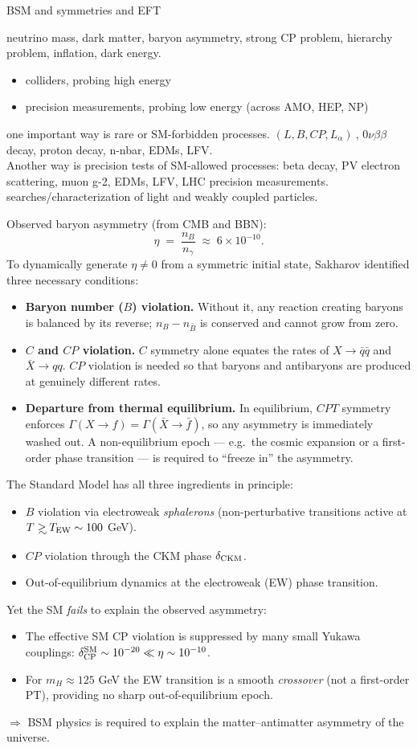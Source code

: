 \documentclass[a4paper]{article}
\newcommand{\talktitle}[1]{%
\vspace{-3em}
\begin{tcolorbox}[colframe=white,opacityback=0]
\begin{tcolorbox}
\Huge\sffamily #1
\end{tcolorbox}
\end{tcolorbox}
\vspace{-2em}
}
\newcommand{\bi}{\begin{itemize}}
\newcommand{\ei}{\end{itemize}}
\def\gsim{\mathrel{\rlap{\lower4pt\hbox{\hskip1pt$\sim$}}
    \raise1pt\hbox{$>$}}}         %
\begin{document}
\newpage

\talktitle{BSM and symmetries and EFT}

{
neutrino mass, dark matter, baryon asymmetry, strong CP problem, hierarchy problem, inflation, dark energy. 
}

{
\bi
\item colliders, probing high energy
\item precision measurements, probing low energy (across AMO, HEP, NP)
\ei
one important way is rare or SM-forbidden processes. $(L, B, CP, L_\alpha)\ $, $0\nu\beta\beta$ decay, proton decay, n-nbar, EDMs, LFV.
\;\\
Another way is precision tests of SM-allowed processes: beta decay, PV electron scattering, muon g-2, EDMs, LFV, LHC precision measurements.
\;\\
searches/characterization of light and weakly coupled particles.
}

{
Observed baryon asymmetry (from CMB and BBN):
\[
\eta \;=\; \frac{n_B}{n_\gamma} \;\approx\; 6\times10^{-10}.
\]
To dynamically generate $\eta\neq 0$ from a symmetric initial state, Sakharov identified three necessary conditions:
\bi
\item \textbf{Baryon number ($B$) violation.}
Without it, any reaction creating baryons is balanced by its reverse; $n_B - n_{\bar B}$ is conserved and cannot grow from zero.
\item \textbf{$C$ and $CP$ violation.}
$C$ symmetry alone equates the rates of $X\!\to\!\bar q\bar q$ and $\bar X\!\to\!qq$.
$CP$ violation is needed so that baryons and antibaryons are produced at genuinely different rates.
\item \textbf{Departure from thermal equilibrium.}
In equilibrium, $CPT$ symmetry enforces $\Gamma(X\!\to\!f)=\Gamma(\bar X\!\to\!\bar f)$, so any asymmetry is immediately washed out.
A non-equilibrium epoch --- e.g.\ the cosmic expansion or a first-order phase transition --- is required to ``freeze in'' the asymmetry.
\ei
The Standard Model has all three ingredients in principle:
\bi
\item $B$ violation via electroweak \textit{sphalerons} (non-perturbative transitions active at $T\gsim T_{\rm EW}\sim100$ GeV).
\item $CP$ violation through the CKM phase $\delta_{\rm CKM}$.
\item Out-of-equilibrium dynamics at the electroweak (EW) phase transition.
\ei
Yet the SM \textit{fails} to explain the observed asymmetry:
\bi
\item The effective SM CP violation is suppressed by many small Yukawa couplings: $\delta_{\rm CP}^{\rm SM}\sim 10^{-20}\ll\eta\sim10^{-10}$.
\item For $m_H\approx125$ GeV the EW transition is a smooth \textit{crossover} (not a first-order PT), providing no sharp out-of-equilibrium epoch.
\ei
$\Rightarrow$ BSM physics is required to explain the matter--antimatter asymmetry of the universe.
}
\end{document}
